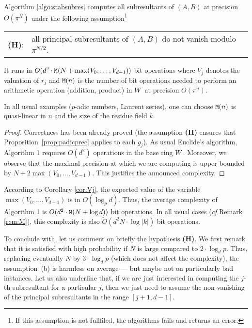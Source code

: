 \documentclass{article}
\begin{document}
\begin{prop}
Algorithm \ref{algo:stabsubres} computes all subresultants of
$(A,B)$ at precision $O(\pi^N)$ under the following 
assumption\footnote{If this assumption is not fullfiled, the
algorithms fails and returns an error.}

\medskip

\begin{tabular}{rl}
{\bf (H)}: & all principal subresultants of $(A,B)$ 
do not vanish modulo $\pi^{N/2}$.
\end{tabular}

\medskip

\noindent
It runs in $O(d^2 \cdot \text{\tt M}(N + \text{\rm max}(V_0, \ldots, V_{d-1}))$ bit 
operations where $V_j$ denotes the valuation of $r_j$ and $\text{\tt M}(n)$ is the 
number of bit operations needed to perform an arithmetic operation 
(addition, product) in $W$ at precision $O(\pi^n)$.
\end{prop}

\begin{rem}
\label{rem:M}
In all usual examples ($p$-adic numbers, Laurent series), one can 
choose $\text{\tt M}(n)$ is quasi-linear in $n$ and the size of the residue
field $k$.
\end{rem}

\begin{proof}
Correctness has been already proved (the assumption {\bf (H)} ensures
that Proposition~\ref{prop:padicprec} applies to each $g_j$).
As usual Euclide's algorithm, Algorithm 1 requires $O(d^2)$ operations 
in the base ring $W$. Moreover, we observe that the maximal precision 
at which we are computing is upper bounded by $N + 2 \max(V_0, \ldots, 
V_{d-1})$. This justifies the announced complexity.
\end{proof}

According to Corollary \ref{cor:Vj}, the expected value of the variable 
$\max(V_0, \ldots, V_{d-1})$ is in $O(\log_p d)$. Thus, the average 
complexity of Algorithm 1 is $O(d^2 \cdot \text{\tt M}(N + \log d))$ bit 
operations. In all usual cases (\emph{cf} Remark \ref{rem:M}), this
complexity is also $\tilde O(d^2 N \cdot \log |k|)$ bit operations.

To conclude with, let us comment on briefly the hypothesis {\bf (H)}. We 
first remark that it is satisfied with high probability if $N$ is large 
compared to $2 \cdot \log_d p$. Thus, replacing eventually $N$ by $3 
\cdot \log_d p$ (which does not affect the complexity), the 
assumption~(b) is harmless on average --- but maybe not on particularly 
bad instances. Let us also underline that, if we are just interested in 
computing the $j$-th subresultant for a particular $j$, then we just 
need to assume the non-vanishing of the principal subresultants in the 
range $[j{+}1, d{-}1]$.
\end{document}
